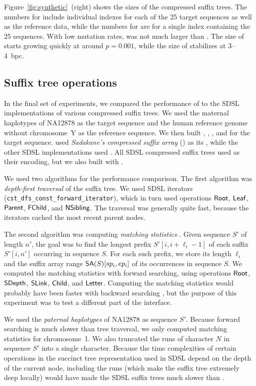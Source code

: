 Figure~\ref{fig:synthetic}~(right) shows the sizes of the compressed suffix
trees. The numbers for \RCST{} include individual indexes for each of the 25
target sequences as well as the reference data, while the numbers for \GCT{}
are for a single index containing the 25 sequences. With low mutation rates,
\RCST{} was not much larger than \GCT{}. The size of \RCST{} starts growing
quickly at around $p = 0.001$, while the size of \GCT{} stabilizes at
3\nobreakdash--4~bpc.

\subsection{Suffix tree operations}

In the final set of experiments, we compared the performance of \RCST{} to the
SDSL implementations of various compressed suffix trees. We used the maternal
haplotypes of NA12878 as the target sequence and the human reference genome
without chromosome~Y as the reference sequence. We then built \RCST, \CSTsada,
\CSTnpr, and \FCST{} for the target sequence. \CSTsada{} used \emph{Sadakane's
compressed suffix array} (\CSAsada) \cite{Sadakane2003} as its \CSA, while the
other SDSL implementations used \SSA. All SDSL compressed suffix trees used
\PLCP{} as their \LCP{} encoding, but we also built \CSTnpr{} with \LCPbyte.

We used two algorithms for the performance comparison. The first algorithm was
\emph{depth-first traversal} of the suffix tree. We used SDSL iterators
(\texttt{cst\_dfs\_const\_forward\_iterator}), which in turn used operations
$\mathsf{Root}$, $\mathsf{Leaf}$, $\mathsf{Parent}$, $\mathsf{FChild}$, and $\mathsf{NSibling}$. The traversal
was generally quite fast, because the iterators cached the most recent parent
nodes.

The second algorithm was computing \emph{matching statistics}
\cite{Chang1994}. Given sequence $S'$ of length $n'$, the goal was to find the
longest prefix $S'[i,i+\ell_{i}-1]$ of each suffix $S'[i,n']$ occurring in
sequence $S$. For each such prefix, we store its length $\ell_{i}$ and the
suffix array range $\mathsf{SA}(S)[sp_{i},ep_{i}]$ of its occurrences in sequence
$S$. We computed the matching statistics with forward searching, using
operations $\mathsf{Root}$, $\mathsf{SDepth}$, $\mathsf{SLink}$, $\mathsf{Child}$, and $\mathsf{Letter}$.
Computing the matching statistics would probably have been faster with
backward searching \cite{Ohlebusch2010a}, but the purpose of this experiment
was to test a different part of the interface.

We used the \emph{paternal haplotypes} of NA12878 as sequence $S'$. Because
forward searching is much slower than tree traversal, we only computed
matching statistics for chromosome~1. We also truncated the runs of character
$N$ in sequence $S'$ into a single character. Because the time complexities of
certain operations in the succinct tree representation used in SDSL depend on
the depth of the current node, including the runs (which make the suffix tree
extremely deep locally) would have made the SDSL suffix trees much slower than
\RCST.

